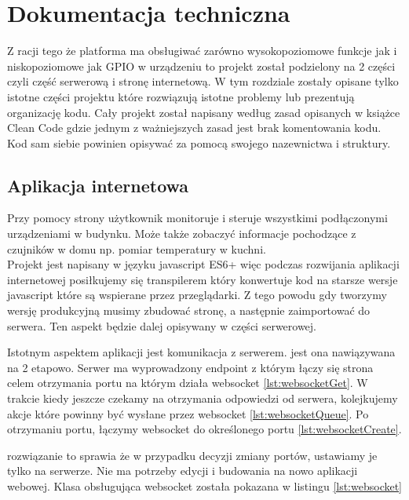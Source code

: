 \chapter{Dokumentacja techniczna}%
Z racji tego że platforma ma obsługiwać zarówno wysokopoziomowe funkcje jak i niskopoziomowe jak GPIO w urządzeniu to projekt został podzielony na 2 części czyli część serwerową i stronę internetową. W tym rozdziale zostały opisane tylko istotne  części projektu które rozwiązują istotne problemy lub prezentują organizację kodu. Cały projekt został napisany według zasad opisanych w książce Clean Code gdzie jednym z ważniejszych zasad jest brak komentowania kodu. Kod sam siebie powinien opisywać za pomocą swojego nazewnictwa i struktury.  \cite{cleancode}
\section{Aplikacja internetowa}
Przy pomocy strony użytkownik monitoruje i steruje wszystkimi podłączonymi urządzeniami w budynku. Może także zobaczyć informacje pochodzące z czujników w domu np. pomiar temperatury w kuchni. \\
Projekt jest napisany w języku javascript ES6+ więc podczas rozwijania aplikacji internetowej posiłkujemy się transpilerem który konwertuje kod na starsze wersje javascript które są wspierane przez przeglądarki. Z tego powodu gdy tworzymy wersję produkcyjną musimy zbudować stronę, a następnie zaimportować do serwera. Ten aspekt będzie dalej opisywany w części serwerowej.
\par Istotnym aspektem aplikacji jest komunikacja z serwerem. jest ona nawiązywana na 2 etapowo.
Serwer ma wyprowadzony endpoint z którym łączy się strona celem otrzymania portu na którym działa websocket
\ref{lst:websocketGet}. W trakcie kiedy jeszcze czekamy na otrzymania odpowiedzi od serwera, kolejkujemy akcje które powinny być wysłane przez websocket \ref{lst:websocketQueue}. Po otrzymaniu portu, łączymy websocket do określonego portu \ref{lst:websocketCreate}. 
\par rozwiązanie to sprawia że w przypadku decyzji zmiany portów, ustawiamy je tylko na serwerze. Nie ma potrzeby edycji i budowania na nowo aplikacji webowej. Klasa obsługująca websocket została pokazana w listingu \ref{lst:websocket}
\newpage
